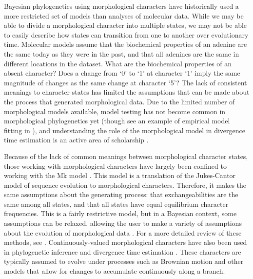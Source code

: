 Bayesian phylogenetics using morphological characters have
historically used a more restricted set of models than analyses of molecular data.
While we may be able to divide a morphological character into multiple states, we may not be able to easily describe how states can transition from one to another over evolutionary time.
Molecular models assume that the biochemical properties of an adenine are the same today as they were in the past, and
that all adenines are the same in different locations in the dataset.
What are the biochemical properties of an absent character?
Does a change from `0' to `1' at character `1' imply the same magnitude of changes as the same change at character `5'?
The lack of consistent meanings to character states has limited the assumptions that can be made about the process that generated morphological data.
Due to the limited number of morphological models available, model testing has not become common in morphological phylogenetics yet (though see an example of empirical model fitting in \cite*{bapst2017}), and understanding the role of the morphological model in divergence time estimation is an active area of scholarship \citep{Klopfstein2019}. 

Because of the lack of common meanings between morphological character states, those working with morphological characters have largely been confined to working with the Mk model \citep{Lewis2001}.
This model is a translation of the Jukes-Cantor model \citep{Jukes1969} of sequence evolution to morphological characters.
Therefore, it makes the same assumptions about the generating process: that exchangeabilities are the same among all states, and that all states have equal equilibrium character frequencies.
This is a fairly restrictive model, but in a Bayesian context, some assumptions can be relaxed, allowing the user to make a variety of assumptions about the evolution of morphological data \citep{Nylander2004, Wright2016}.
For a more detailed review of these methods, see \citep{Wright2019}. 
Continuously-valued morphological characters have also been used in phylogenetic inference \citep{goloboff2006, parins2017} and divergence time estimation \citep{AlvarezC2019}.
These characters are typically assumed to evolve under processes such as Brownian motion and other models that allow for changes to accumulate continuously along a branch.  


